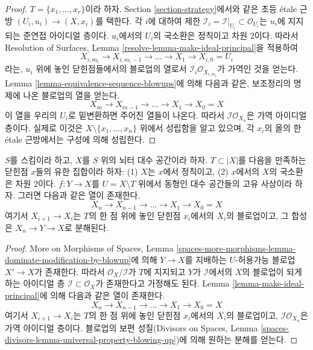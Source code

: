 \begin{proof}
$T = \{x_1, \ldots, x_r\}$이라 하자. Section \ref{section-strategy}에서와 같은
초등 \'etale 근방 $(U_i, u_i) \to (X, x_i)$를 택한다.
각 $i$에 대하여 제한
$\mathcal{I}_i = \mathcal{I}|_{U_i} \subset \mathcal{O}_{U_i}$는
$u_i$에 지지되는 준연접 아이디얼 층이다.
$u_i$에서의 $U_i$의 국소환은 정칙이고 차원 $2$이다.
따라서 Resolution of Surfaces, Lemma
\ref{resolve-lemma-make-ideal-principal}을 적용하여
$$
X_{i, m_i} \to X_{i, m_i - 1} \to \ldots \to X_1 \to X_{i, 0} = U_i
$$
라는, $u_i$ 위에 놓인 닫힌점들에서의 블로업의 열로서
$\mathcal{I}_i \mathcal{O}_{X_{i, m_i}}$가 가역인 것을 얻는다.
Lemma \ref{lemma-equivalence-sequence-blowups}에 의해
다음과 같은, 보조정리의 명제에 나온 블로업의 열을 얻는다.
$$
X_m \to X_{m - 1} \to \ldots \to X_1 \to X_0 = X
$$
이 열을 우리의 $U_i$로 밑변환하면 주어진 열들이 나온다.
따라서 $\mathcal{I}\mathcal{O}_{X_n}$은 가역 아이디얼 층이다.
실제로 이것은
$X \setminus \{x_1, \ldots, x_n\}$ 위에서 성립함을 알고 있으며,
각 $x_i$의 올의 한 \'etale 근방에서는 구성에 의해 성립한다.
\end{proof}

\begin{lemma}
\label{lemma-dominate-by-blowing-up-in-points}
$S$를 스킴이라 하고, $X$를 $S$ 위의 뇌터 대수 공간이라 하자.
$T \subset |X|$를 다음을 만족하는 닫힌점 $x$들의 유한 집합이라 하자:
(1) $X$는 $x$에서 정칙이고, (2) $x$에서의 $X$의 국소환은 차원 $2$이다.
$f : Y \to X$를 $U = X \setminus T$ 위에서 동형인
대수 공간들의 고유 사상이라 하자. 그러면 다음과 같은 열이 존재한다.
$$
X_n \to X_{n - 1} \to \ldots \to X_1 \to X_0 = X
$$
여기서 $X_{i + 1} \to X_i$는 $T$의 한 점 위에 놓인 닫힌점
$x_i$에서의 $X_i$의 블로업이고, 그 합성은
$X_n \to Y \to X$로 분해된다.
\end{lemma}

\begin{proof}
More on Morphisms of Spaces, Lemma
\ref{spaces-more-morphisms-lemma-dominate-modification-by-blowup}에 의해
$Y \to X$를 지배하는 $U$-허용가능 블로업 $X' \to X$가 존재한다.
따라서 $\mathcal{O}_X/\mathcal{I}$가 $T$에 지지되고
$Y$가 $\mathcal{I}$에서의 $X$의 블로업이 되게 하는
아이디얼 층 $\mathcal{I} \subset \mathcal{O}_X$가 존재한다고 가정해도 된다.
Lemma \ref{lemma-make-ideal-principal}에 의해 다음과 같은 열이 존재한다.
$$
X_n \to X_{n - 1} \to \ldots \to X_1 \to X_0 = X
$$
여기서 $X_{i + 1} \to X_i$는 $T$의 한 점 위에 놓인 닫힌점
$x_i$에서의 $X_i$의 블로업이고,
$\mathcal{I}\mathcal{O}_{X_n}$은 가역 아이디얼 층이다.
블로업의 보편 성질(Divisors on Spaces, Lemma
\ref{spaces-divisors-lemma-universal-property-blowing-up})에 의해
원하는 분해를 얻는다.
\end{proof}





